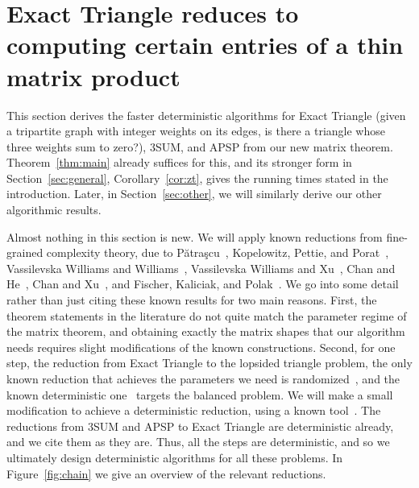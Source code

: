 \section{Exact Triangle reduces to computing certain entries of a thin matrix product}\label{sec:reduction}


This section derives the faster deterministic algorithms for Exact Triangle (given a tripartite graph with integer weights on its edges, is there a triangle whose three weights sum to zero?), $3$SUM, and APSP from our new matrix theorem. Theorem~\ref{thm:main} already suffices for this, and its stronger form in Section~\ref{sec:general}, Corollary~\ref{cor:zt}, gives the running times stated in the introduction. Later, in Section~\ref{sec:other}, we will similarly derive our other algorithmic results.

Almost nothing in this section is new. We will apply known reductions from fine-grained complexity theory, due to P\u{a}tra\c{s}cu~\cite{Pat10}, Kopelowitz, Pettie, and Porat~\cite{KPP16}, Vassilevska Williams and Williams~\cite{VW13,VW10,VW18}, Vassilevska Williams and Xu~\cite{VX20a}, Chan and He~\cite{CH20}, Chan and Xu~\cite{CX24}, and Fischer, Kaliciak, and Polak~\cite{FKP24}. We go into some detail rather than just citing these known results for two main reasons. First, the theorem statements in the literature do not quite match the parameter regime of the matrix theorem, and obtaining exactly the matrix shapes that our algorithm needs requires slight modifications of the known constructions. Second, for one step, the reduction from Exact Triangle to the lopsided triangle problem, the only known reduction that achieves the parameters we need is randomized~\cite{VX20a}, and the known deterministic one~\cite{CX24} targets the balanced problem. We will make a small modification to achieve a deterministic reduction, using a known tool~\cite{FKP24}. The reductions from $3$SUM and APSP to Exact Triangle are deterministic already, and we cite them as they are. Thus, all the steps are deterministic, and so we ultimately design deterministic algorithms for all these problems. In Figure~\ref{fig:chain} we give an overview of the relevant reductions.

